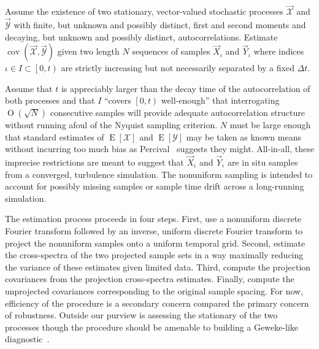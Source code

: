 \documentclass[letterpaper,11pt,nointlimits,reqno]{amsart}
\newcommand{\OO}[1]{\operatorname{O}\left(#1\right)}
\DeclareMathOperator{\cov}{cov}
\begin{document}
Assume the existence of two stationary, vector-valued stochastic processes
$\vec{\mathscr{X}}$ and $\vec{\mathscr{Y}}$ with finite, but unknown and
possibly distinct, first and second moments and decaying, but unknown and
possibly distinct, autocorrelations.  Estimate
$\cov\left(\vec{\mathscr{X}},\vec{\mathscr{Y}}\right)$ given two length $N$
sequences of samples $\vec{X}_{\iota}$ and $\vec{Y}_{\iota}$ where indices
$\iota\in{}I\subset\left[0,t\right)$ are strictly increasing but not
necessarily separated by a fixed $\Delta{}t$.

Assume that $t$ is appreciably larger than the decay time of the
autocorrelation of both processes and that $I$ ``covers $\left[0,t\right)$
well-enough'' that interrogating $\OO{\sqrt{N}}$ consecutive samples will provide
adequate autocorrelation structure without running afoul of the
Nyquist sampling criterion.  $N$ must be large enough that standard estimates
of $\operatorname{E}\left[\mathscr{X}\right]$ and
$\operatorname{E}\left[\mathscr{Y}\right]$ may be taken as known means without
incurring too much bias as Percival~\cite{Percival1993Three} suggests they
might.  All-in-all, these imprecise restrictions are meant to suggest that
$\vec{X}_\iota$ and $\vec{Y}_\iota$ are in situ samples from a converged,
turbulence simulation.  The nonuniform sampling is intended to account for
possibly missing samples or sample time drift across a long-running simulation.

The estimation process proceeds in four steps.  First, use a nonuniform
discrete Fourier transform followed by an inverse, uniform discrete Fourier
transform to project the nonuniform samples onto a uniform temporal grid.
Second, estimate the cross-spectra of the two projected sample sets in a way
maximally reducing the variance of these estimates given limited data.  Third,
compute the projection covariances from the projection cross-spectra estimates.
Finally, compute the unprojected covariances corresponding to the original
sample spacing.  For now, efficiency of the procedure is a secondary concern
compared the primary concern of robustness.  Outside our purview is assessing
the stationary of the two processes though the procedure should be amenable to
building a Geweke-like diagnostic~\cite{Geweke1992Evaluating}.



\end{document}
